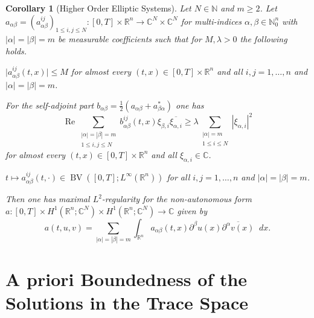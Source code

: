 \documentclass[reqno,a4paper,final]{amsart}
\numberwithin{equation}{section}
\newtheorem{corollary}[lemma]{Corollary}
\theoremstyle{definition}
\begin{document}
	\begin{corollary}[Higher Order Elliptic Systems]
		Let $N \in {\mathbb{N}}$ and $m \ge 2$. Let $a_{\alpha \beta} = (a_{\alpha \beta}^{ij})_{1 \le i,j \le N} \colon [0,T] \times {\mathbb{R}}^n \to {\mathbb{C}}^N \times {\mathbb{C}}^N$ for multi-indices $\alpha, \beta \in {\mathbb{N}}_0^n$ with ${\left\lvert{\alpha}\right\rvert} = {\left\lvert{\beta}\right\rvert} = m$ be measurable coefficients such that for $M, \lambda > 0$ the following holds.
		\begin{thm_enum}
			\item ${\lvert{a_{\alpha \beta}^{ij}(t,x)}\rvert} \le M$ for almost every $(t,x) \in [0,T] \times {\mathbb{R}}^n$ and all $i,j = 1, \ldots, n$ and ${\left\lvert{\alpha}\right\rvert} = {\left\lvert{\beta}\right\rvert} = m$.
			\item 
			For the self-adjoint part $b_{\alpha \beta} = \frac{1}{2} (a_{\alpha \beta} + a_{\beta \alpha}^*)$ one has
			\begin{equation*}
				{\operatorname{Re}} \sum_{\substack{{\left\lvert{\alpha}\right\rvert} = {\left\lvert{\beta}\right\rvert} = m \\ 1 \le i, j \le N}} b_{\alpha \beta}^{ij}(t,x) \xi_{\beta,i} \overline{\xi_{\alpha, i}} \ge \lambda \sum_{\substack{{\left\lvert{\alpha}\right\rvert} = m \\ 1 \le i \le N}} {\left\lvert{\xi_{\alpha,i}}\right\rvert}^2
			\end{equation*}
			for almost every $(t,x) \in [0,T] \times {\mathbb{R}}^n$ and all $\xi_{\alpha,i} \in {\mathbb{C}}$.
			\item $t \mapsto a_{\alpha \beta}^{ij}(t,\cdot) \in \operatorname{BV}([0,T];L^{\infty}({\mathbb{R}}^n))$ for all $i,j = 1, \ldots, n$ and ${\left\lvert{\alpha}\right\rvert} = {\left\lvert{\beta}\right\rvert} = m$.
		\end{thm_enum}
		Then one has maximal $L^2$-regularity for the non-autonomous form $a\colon [0,T] \times H^1({\mathbb{R}}^n;{\mathbb{C}}^N) \times H^1({\mathbb{R}}^n;{\mathbb{C}}^N) \to {\mathbb{C}}$ given by
		\begin{equation*}
			a(t,u,v) = \sum_{{\left\lvert{\alpha}\right\rvert} = {\left\lvert{\beta}\right\rvert} = m} \int_{{\mathbb{R}}^n} a_{\alpha \beta}(t,x) \partial^{\beta} u(x) \overline{\partial^{\alpha} v(x)} {\mathop{}\!d} x.
		\end{equation*}
	\end{corollary}
	
\section{A priori Boundedness of the Solutions in the Trace Space}\label{sec:a_priori_bounded}
\end{document}
